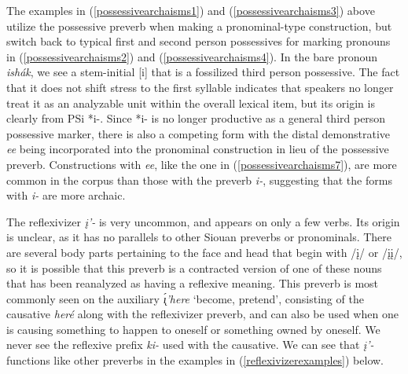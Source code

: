 The examples in (\ref{possessivearchaisms1}) and (\ref{possessivearchaisms3}) above utilize the possessive preverb when making a pronominal-type construction, but switch back to typical first and second person possessives for marking pronouns in (\ref{possessivearchaisms2}) and (\ref{possessivearchaisms4}). In the bare pronoun \textit{ishák}, we see a stem-initial [i] that is a fossilized third person possessive. The fact that it does not shift stress to the first syllable indicates that speakers no longer treat it as an analyzable unit within the overall lexical item, but its origin is clearly from PSi *i-. Since *i- is no longer productive as a general third person possessive marker, there is also a competing form with the distal demonstrative \textit{ee} being incorporated into the pronominal construction in lieu of the possessive preverb. Constructions with \textit{ee}, like the one in (\ref{possessivearchaisms7}), are more common in the corpus than those with the preverb \textit{i-}, suggesting that the forms with \textit{i-} are more archaic.

\label{SubParaReflexivizer}

The reflexivizer \textit{į'-} is very uncommon, and appears on only a few verbs. Its origin is unclear, as it has no parallels to other Siouan preverbs or pronominals. There are several body parts pertaining to the face and head that begin with /į/ or /įį/, so it is possible that this preverb is a contracted version of one of these nouns that has been reanalyzed as having a reflexive meaning. This preverb is most commonly seen on the auxiliary \textit{\'{ı̨}'here} `become, pretend', consisting of the causative \textit{heré} along with the reflexivizer preverb, and can also be used when one is causing something to happen to oneself or something owned by oneself. We never see the reflexive prefix \textit{ki-} used with the causative. We can see that \textit{į'-} functions like other preverbs in the examples in (\ref{reflexivizerexamples}) below.

